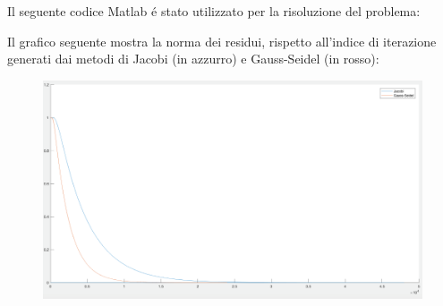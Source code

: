 \begin{center}
\large\noindent{}
\end{center}

\noindent Il seguente codice Matlab \'e stato utilizzato per la risoluzione del problema:



\vspace*{1cm}

\noindent Il grafico seguente mostra la norma dei residui, rispetto all'indice di iterazione generati dai metodi di Jacobi (in azzurro) e Gauss-Seidel (in rosso):


\begin{figure}[H]
	\includegraphics[width=\textwidth]{Codici/Cap6/Es5_Cap61}
\end{figure}